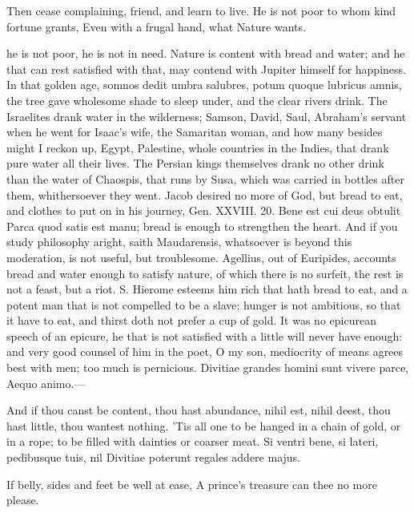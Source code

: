 {Then cease complaining, friend, and learn to live.
He is not poor to whom kind fortune grants,
Even with a frugal hand, what Nature wants.

he is not poor, he is not in need. Nature is content with bread
and water; and he that can rest satisfied with that, may contend with
Jupiter himself for happiness. In that golden age, somnos dedit
umbra salubres, potum quoque lubricus amnis, the tree gave wholesome
shade to sleep under, and the clear rivers drink. The Israelites drank
water in the wilderness; Samson, David, Saul, Abraham's servant when he
went for Isaac's wife, the Samaritan woman, and how many besides might
I reckon up, Egypt, Palestine, whole countries in the Indies,
that drank pure water all their lives. The Persian kings
themselves drank no other drink than the water of Chaospis, that runs
by Susa, which was carried in bottles after them, whithersoever they
went. Jacob desired no more of God, but bread to eat, and clothes to
put on in his journey, Gen. XXVIII. 20. Bene est cui deus obtulit Parca
quod satis est manu; bread is enough to strengthen the heart. And
if you study philosophy aright, saith  Maudarensis, whatsoever is
beyond this moderation, is not useful, but troublesome. Agellius,
out of Euripides, accounts bread and water enough to satisfy nature, of
which there is no surfeit, the rest is not a feast, but a riot.
S. Hierome esteems him rich that hath bread to eat, and a potent
man that is not compelled to be a slave; hunger is not ambitious, so
that it have to eat, and thirst doth not prefer a cup of gold. It was
no epicurean speech of an epicure, he that is not satisfied with a
little will never have enough: and very good counsel of him in the
poet, O my son, mediocrity of means agrees best with men; too
much is pernicious.
Divitiae grandes homini sunt vivere parce,
Aequo animo.---

And if thou canst be content, thou hast abundance, nihil est, nihil
deest, thou hast little, thou wantest nothing. 'Tis all one to be
hanged in a chain of gold, or in a rope; to be filled with dainties or
coarser meat.
Si ventri bene, si lateri, pedibusque tuis, nil
Divitiae poterunt regales addere majus.

If belly, sides and feet be well at ease,
A prince's treasure can thee no more please.

}
